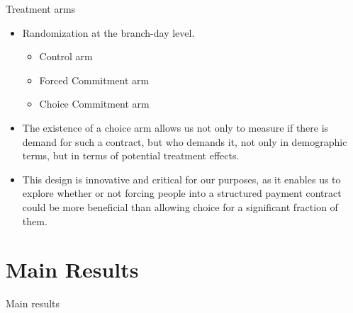 \documentclass[8pt]{beamer}
\begin{document}
\begin{frame}{Treatment arms}
   \begin{itemize}
    \vfill \item Randomization at the branch-day level. 
    \begin{itemize}
        \vfill \item Control arm 
       \vfill \item Forced Commitment arm
       \vfill \item Choice Commitment arm
    \end{itemize}
    \vfill \pause \item The  existence  of  a  choice  arm  allows  us  not  only  to  measure  if  there  is  demand  for  such  a contract, but who demands it, not only in demographic terms, but in terms of potential treatment effects.
   \vfill \pause \item  This design is innovative and critical for our purposes, as it enables us to explore whether or not forcing people into a structured payment contract could be more beneficial than allowing choice for a significant fraction of them.
\end{itemize}
\end{frame}











\section{Main Results}
\begin{frame}{Main results}

\begin{table}[H]
\caption{Main treatment effects}
\label{main_impact_table}
\begin{center}
\resizebox{0.95\textwidth}{!}{
\scriptsize{}
}
\end{center}
\end{table}
\end{frame}
\end{document}
